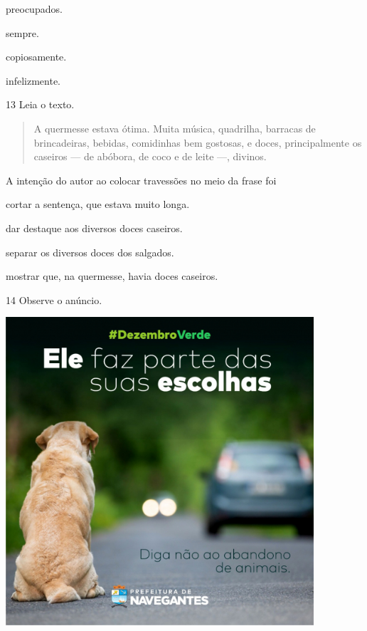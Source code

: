 \begin{escolha}
\item preocupados.

\item sempre.

\item copiosamente.

\item infelizmente.
\end{escolha}

\num{13} Leia o texto.

\begin{quote}
A quermesse estava ótima. Muita música, quadrilha, barracas de
brincadeiras, bebidas, comidinhas bem gostosas, e doces, principalmente
os caseiros --- de abóbora, de coco e de leite ---, divinos.
\end{quote}

A intenção do autor ao colocar travessões no meio da frase foi

\begin{escolha}
\item cortar a sentença, que estava muito longa.

\item dar destaque aos diversos doces caseiros.

\item separar os diversos doces dos salgados.

\item mostrar que, na quermesse, havia doces caseiros.
\end{escolha}

\num{14} Observe o anúncio.

\includegraphics[width=4.50972in,height=4.50972in]{./media/simulados/image6.png}

